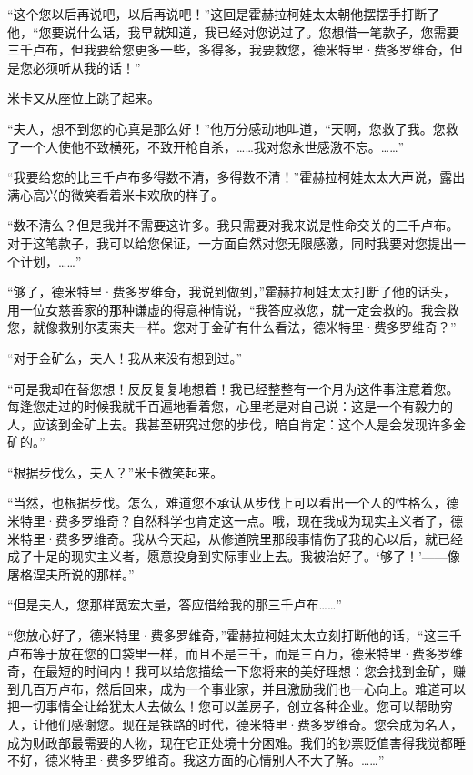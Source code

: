 \par “这个您以后再说吧，以后再说吧！”这回是霍赫拉柯娃太太朝他摆摆手打断了他，“您要说什么话，我早就知道，我已经对您说过了。您想借一笔款子，您需要三千卢布，但我要给您更多一些，多得多，我要救您，德米特里·费多罗维奇，但是您必须听从我的话！”
\par 米卡又从座位上跳了起来。
\par “夫人，想不到您的心真是那么好！”他万分感动地叫道，“天啊，您救了我。您救了一个人使他不致横死，不致开枪自杀，……我对您永世感激不忘。……”
\par “我要给您的比三千卢布多得数不清，多得数不清！”霍赫拉柯娃太太大声说，露出满心高兴的微笑看着米卡欢欣的样子。
\par “数不清么？但是我并不需要这许多。我只需要对我来说是性命交关的三千卢布。对于这笔款子，我可以给您保证，一方面自然对您无限感激，同时我要对您提出一个计划，……”
\par “够了，德米特里·费多罗维奇，我说到做到，”霍赫拉柯娃太太打断了他的话头，用一位女慈善家的那种谦虚的得意神情说，“我答应救您，就一定会救的。我会救您，就像救别尔麦索夫一样。您对于金矿有什么看法，德米特里·费多罗维奇？”
\par “对于金矿么，夫人！我从来没有想到过。”
\par “可是我却在替您想！反反复复地想着！我已经整整有一个月为这件事注意着您。每逢您走过的时候我就千百遍地看着您，心里老是对自己说：这是一个有毅力的人，应该到金矿上去。我甚至研究过您的步伐，暗自肯定：这个人是会发现许多金矿的。”
\par “根据步伐么，夫人？”米卡微笑起来。
\par “当然，也根据步伐。怎么，难道您不承认从步伐上可以看出一个人的性格么，德米特里·费多罗维奇？自然科学也肯定这一点。哦，现在我成为现实主义者了，德米特里·费多罗维奇。我从今天起，从修道院里那段事情伤了我的心以后，就已经成了十足的现实主义者，愿意投身到实际事业上去。我被治好了。‘够了！’——像屠格涅夫所说的那样。”
\par “但是夫人，您那样宽宏大量，答应借给我的那三千卢布……”
\par “您放心好了，德米特里·费多罗维奇，”霍赫拉柯娃太太立刻打断他的话，“这三千卢布等于放在您的口袋里一样，而且不是三千，而是三百万，德米特里·费多罗维奇，在最短的时间内！我可以给您描绘一下您将来的美好理想：您会找到金矿，赚到几百万卢布，然后回来，成为一个事业家，并且激励我们也一心向上。难道可以把一切事情全让给犹太人去做么！您可以盖房子，创立各种企业。您可以帮助穷人，让他们感谢您。现在是铁路的时代，德米特里·费多罗维奇。您会成为名人，成为财政部最需要的人物，现在它正处境十分困难。我们的钞票贬值害得我觉都睡不好，德米特里·费多罗维奇。我这方面的心情别人不大了解。……”
